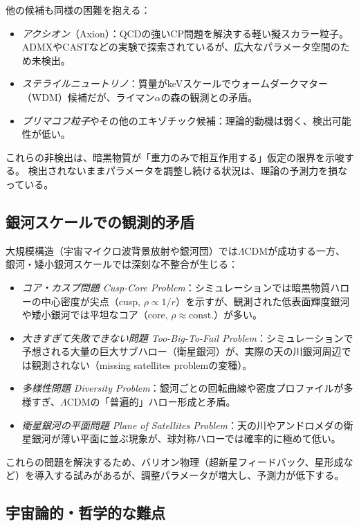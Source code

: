 \documentclass[dvipdfmx,a4paper]{jsbook}
\theoremstyle{definition}
\theoremstyle{remark}
\begin{document}
他の候補も同様の困難を抱える：
\begin{itemize}
  \item \emph{アクシオン}（Axion）：QCDの強いCP問題を解決する軽い擬スカラー粒子。ADMXやCASTなどの実験で探索されているが、広大なパラメータ空間のため未検出。
  \item \emph{ステライルニュートリノ}：質量がkeVスケールでウォームダークマター（WDM）候補だが、ライマン$\alpha$の森の観測との矛盾。
  \item \emph{プリマコフ粒子}やその他のエキゾチック候補：理論的動機は弱く、検出可能性が低い。
\end{itemize}

これらの非検出は、暗黒物質が「重力のみで相互作用する」仮定の限界を示唆する。  
検出されないままパラメータを調整し続ける状況は、理論の予測力を損なっている。

\subsection{銀河スケールでの観測的矛盾}

大規模構造（宇宙マイクロ波背景放射や銀河団）では$\Lambda$CDMが成功する一方、銀河・矮小銀河スケールでは深刻な不整合が生じる：
\begin{itemize}
  \item \emph{コア・カスプ問題 Cusp-Core Problem}：シミュレーションでは暗黒物質ハローの中心密度が尖点（cusp, $\rho \propto 1/r$）を示すが、観測された低表面輝度銀河や矮小銀河では平坦なコア（core, $\rho \approx \text{const.}$）が多い。
  \item \emph{大きすぎて失敗できない問題 Too-Big-To-Fail Problem}：シミュレーションで予想される大量の巨大サブハロー（衛星銀河）が、実際の天の川銀河周辺では観測されない（missing satellites problemの変種）。
  \item \emph{多様性問題 Diversity Problem}：銀河ごとの回転曲線や密度プロファイルが多様すぎ、$\Lambda$CDMの「普遍的」ハロー形成と矛盾。
  \item \emph{衛星銀河の平面問題 Plane of Satellites Problem}：天の川やアンドロメダの衛星銀河が薄い平面に並ぶ現象が、球対称ハローでは確率的に極めて低い。
\end{itemize}

これらの問題を解決するため、バリオン物理（超新星フィードバック、星形成など）を導入する試みがあるが、調整パラメータが増大し、予測力が低下する。

\subsection{宇宙論的・哲学的な難点}
\end{document}
